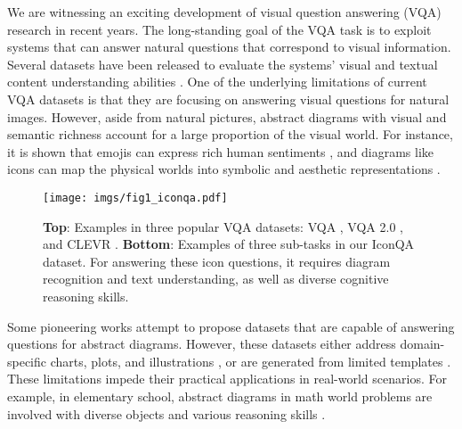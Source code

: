 \documentclass{article}
\begin{document}
We are witnessing an exciting development of visual question answering (VQA) research in recent years. The long-standing goal of the VQA task is to exploit systems that can answer natural questions that correspond to visual information. Several datasets have been released to evaluate the systems' visual and textual content understanding abilities \cite{antol2015vqa, zhu2016cvpr, balanced_vqa_v2, johnson2017clevr, hudson2019gqa, wang2020general}. One of the underlying limitations of current VQA datasets is that they are focusing on answering visual questions for natural images. However, aside from natural pictures, abstract diagrams with visual and semantic richness account for a large proportion of the visual world. For instance, it is shown that emojis can express rich human sentiments \cite{kembhavi2016diagram,felbo2017using}, and diagrams like icons can map the physical worlds into symbolic and aesthetic representations \cite{lagunas2019learning, madan2018synthetically, karamatsu2020iconify}. 


\begin{figure}[t]
    \centering 
\texttt{[image: imgs/fig1\_iconqa.pdf]}
\caption{\textbf{Top}: Examples in three popular VQA datasets: VQA \cite{antol2015vqa}, VQA 2.0 \cite{balanced_vqa_v2}, and CLEVR \cite{johnson2017clevr}. \textbf{Bottom}: Examples of three sub-tasks in our IconQA dataset. For answering these icon questions, it requires diagram recognition and text understanding, as well as diverse cognitive reasoning skills.}
    \vspace{-2mm}
    \label{fig1:example}
\end{figure}

Some pioneering works attempt to propose datasets that are capable of answering questions for abstract diagrams. However, these datasets either address domain-specific charts, plots, and illustrations \cite{kembhavi2016diagram,kafle2018dvqa}, or are generated from limited templates \cite{balanced_binary_vqa,johnson2017clevr}. These limitations impede their practical applications in real-world scenarios. For example, in elementary school, abstract diagrams in math world problems are involved with diverse objects and various reasoning skills \cite{karamustafaouglu2011improving}.
\end{document}
